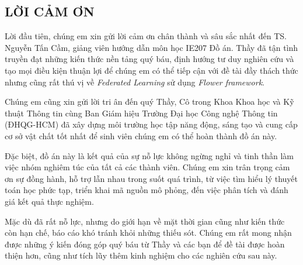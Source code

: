 \documentclass[12pt,a4paper]{article}
\begin{document}
\vspace{0.5cm}


\newpage
\thispagestyle{empty} %

\begin{center}
    \section*{LỜI CẢM ƠN}
\end{center}

\vspace{1cm}

Lời đầu tiên, chúng em xin gửi lời cảm ơn chân thành và sâu sắc nhất đến TS. Nguyễn Tấn Cầm, giảng viên hướng dẫn môn học IE207 Đồ án. Thầy đã tận tình truyền đạt những kiến thức nền tảng quý báu, định hướng tư duy nghiên cứu và tạo mọi điều kiện thuận lợi để chúng em có thể tiếp cận với đề tài đầy thách thức nhưng cũng rất thú vị về \textit{Federated Learning} sử dụng \textit{Flower framework}.

Chúng em cũng xin gửi lời tri ân đến quý Thầy, Cô trong Khoa Khoa học và Kỹ thuật Thông tin cùng Ban Giám hiệu Trường Đại học Công nghệ Thông tin (ĐHQG-HCM) đã xây dựng môi trường học tập năng động, sáng tạo và cung cấp cơ sở vật chất tốt nhất để sinh viên chúng em có thể hoàn thành đồ án này.

Đặc biệt, đồ án này là kết quả của sự nỗ lực không ngừng nghỉ và tinh thần làm việc nhóm nghiêm túc của tất cả các thành viên. Chúng em xin trân trọng cảm ơn sự đồng hành, hỗ trợ lẫn nhau trong suốt quá trình, từ việc tìm hiểu lý thuyết toán học phức tạp, triển khai mã nguồn mô phỏng, đến việc phân tích và đánh giá kết quả thực nghiệm.

Mặc dù đã rất nỗ lực, nhưng do giới hạn về mặt thời gian cũng như kiến thức còn hạn chế, báo cáo khó tránh khỏi những thiếu sót. Chúng em rất mong nhận được những ý kiến đóng góp quý báu từ Thầy và các bạn để đề tài được hoàn thiện hơn, cũng như tích lũy thêm kinh nghiệm cho các nghiên cứu sau này.


\newpage
\tableofcontents
\newpage
\end{document}
